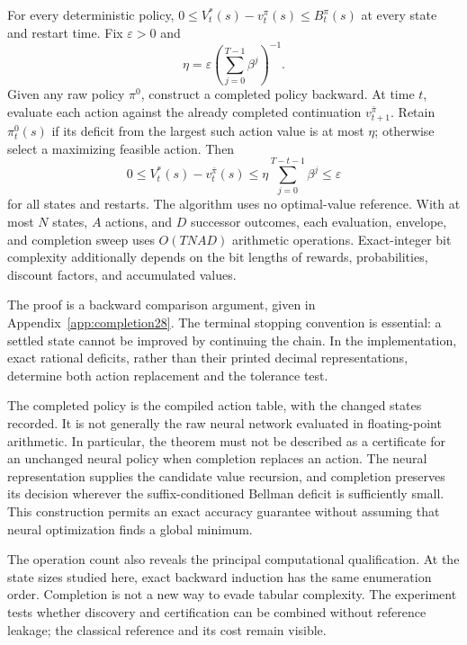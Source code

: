 \begin{theorem}\label{thm:completion28}
For every deterministic policy, $0\le V_t^*(s)-v_t^\pi(s)\le B_t^\pi(s)$ at every state and restart time. Fix $\varepsilon>0$ and
\begin{equation}
 \eta=\varepsilon\left(\sum_{j=0}^{T-1}\beta^j\right)^{-1}.
\end{equation}
Given any raw policy $\pi^0$, construct a completed policy backward. At time $t$, evaluate each action against the already completed continuation $v_{t+1}^{\bar\pi}$. Retain $\pi_t^0(s)$ if its deficit from the largest such action value is at most $\eta$; otherwise select a maximizing feasible action. Then
\begin{equation}\label{eq:completionguarantee28}
 0\le V_t^*(s)-v_t^{\bar\pi}(s)
 \le\eta\sum_{j=0}^{T-t-1}\beta^j\le\varepsilon
\end{equation}
for all states and restarts. The algorithm uses no optimal-value reference. With at most $N$ states, $A$ actions, and $D$ successor outcomes, each evaluation, envelope, and completion sweep uses $O(TNAD)$ arithmetic operations. Exact-integer bit complexity additionally depends on the bit lengths of rewards, probabilities, discount factors, and accumulated values.
\end{theorem}
The proof is a backward comparison argument, given in Appendix~\ref{app:completion28}. The terminal stopping convention is essential: a settled state cannot be improved by continuing the chain. In the implementation, exact rational deficits, rather than their printed decimal representations, determine both action replacement and the tolerance test.

The completed policy is the compiled action table, with the changed states recorded. It is not generally the raw neural network evaluated in floating-point arithmetic. In particular, the theorem must not be described as a certificate for an unchanged neural policy when completion replaces an action. The neural representation supplies the candidate value recursion, and completion preserves its decision wherever the suffix-conditioned Bellman deficit is sufficiently small. This construction permits an exact accuracy guarantee without assuming that neural optimization finds a global minimum.

The operation count also reveals the principal computational qualification. At the state sizes studied here, exact backward induction has the same enumeration order. Completion is not a new way to evade tabular complexity. The experiment tests whether discovery and certification can be combined without reference leakage; the classical reference and its cost remain visible.

